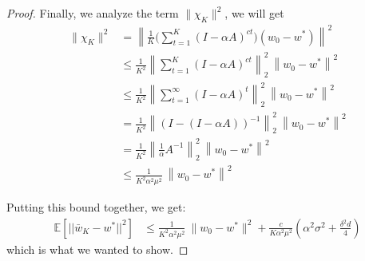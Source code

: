 \begin{proof}
Finally, we analyze the term $\|\chi_K\|^2$, we will get
\begin{align*}
\|\chi_K\|^2 &= \left\|\frac{1}{K}\big(\displaystyle\sum_{t=1}^K(I-\alpha A)^{ct}\big)(w_0-w^*)\right\|^2 \\
&\leq \frac{1}{K^2}\left\|\displaystyle\sum_{t=1}^K(I-\alpha A)^{ct}\right\|_2^2 \  \left\|w_0 -w^*\right\|^2 \\
&\leq \frac{1}{K^2}\left\|\displaystyle\sum_{t=1}^\infty (I-\alpha A)^t\right\|_2^2 \ \left\|w_0 -w^*\right\|^2 \\
&= \frac{1}{K^2}\left\|(I - (I - \alpha A))^{-1}\right\|_2^2 \ \left\|w_0 -w^*\right\|^2 \\
&= \frac{1}{K^2}\left\|\frac{1}{\alpha}A^{-1}\right\|_2^2 \ \left\|w_0 -w^*\right\|^2 \\
&\leq \frac{1}{K^2\alpha^2\mu^2} \ \left\|w_0 -w^*\right\|^2
\end{align*}

Putting this bound together, we get:
\begin{align*}
    \mathbb{E}[||\bar{w}_K - w^*||^2]
&\leq \frac{1}{K^2\alpha^2\mu^2} \ \|w_0 -w^*\|^2 + 
    \frac{c}{K\alpha^2\mu^2} \left(\alpha^2\sigma^2 + \frac{\delta^2d}{4} \right)
\end{align*}
which is what we wanted to show.
\end{proof}
